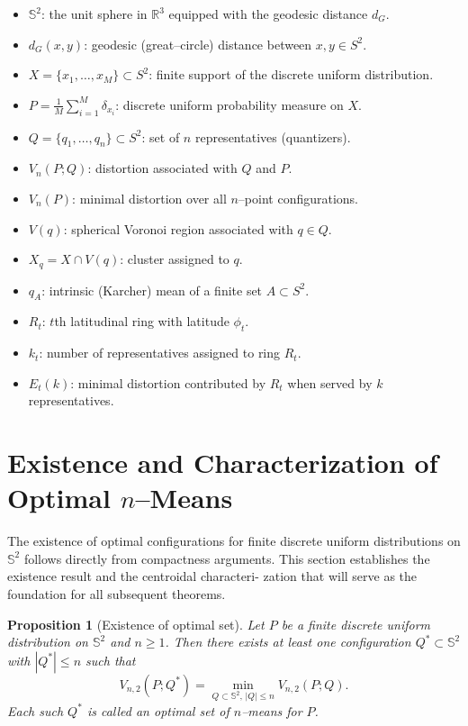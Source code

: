 \documentclass[12pt, reqno]{amsart}
\theoremstyle{plain}
\newtheorem{prop}[subsection]{Proposition}
\theoremstyle{definition}
\newcommand{\D}[1]{\mathbb{#1}}%
\begin{document}
\begin{itemize}
\item $\D S^2$: the unit sphere in $\mathbb{R}^3$ equipped with the geodesic distance $d_G$.
\item $d_G(x,y)$: geodesic (great–circle) distance between $x,y\in S^2$.
\item $X=\{x_1,\dots,x_M\}\subset S^2$: finite support of the discrete uniform distribution.
\item $P=\frac1M\sum_{i=1}^M \delta_{x_i}$: discrete uniform probability measure on $X$.
\item $Q=\{q_1,\dots,q_n\}\subset S^2$: set of $n$ representatives (quantizers).
\item $V_n(P;Q)$: distortion associated with $Q$ and $P$.
\item $V_n(P)$: minimal distortion over all $n$–point configurations.
\item $V(q)$: spherical Voronoi region associated with $q\in Q$.
\item $X_q = X\cap V(q)$: cluster assigned to $q$.
\item $q_A$: intrinsic (Karcher) mean of a finite set $A\subset S^2$.
\item $R_t$: $t$th latitudinal ring with latitude $\phi_t$.
\item $k_t$: number of representatives assigned to ring $R_t$.
\item $E_t(k)$: minimal distortion contributed by $R_t$ when served by $k$ representatives.
\end{itemize}
















 
 \section{Existence and Characterization of Optimal $n$--Means}\label{sec3}

The existence of optimal configurations for finite discrete uniform distributions on $\D S^2$ follows directly
from compactness arguments. This section establishes the existence result and the centroidal characteri-
zation that will serve as the foundation for all subsequent theorems.
\medskip
  

\begin{prop} [Existence of optimal set]
Let $P$ be a finite discrete uniform distribution on $\D S^2$ and $n \ge 1$. Then there exists at least one
configuration $ {Q}^* \subset \D S^2$ with $| {Q}^*| \le n$ such that
\[
V_{n,2}(P; {Q}^*) = \min_{ {Q} \subset \D S^2,\, | {Q}| \le n} V_{n,2}(P; {Q}).
\]
Each such $ {Q}^*$ is called an optimal set of $n$--means for $P$.
\end{prop}
\end{document}
